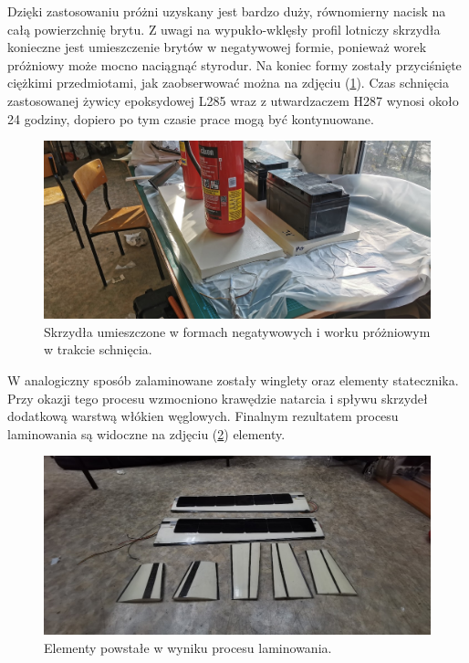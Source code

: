 \documentclass[12pt, a4paper]{article}
\let\oldref\ref
\renewcommand{\ref}[1]{(\oldref{#1})}
\begin{document}
Dzięki zastosowaniu próżni uzyskany jest bardzo duży, równomierny nacisk na całą powierzchnię brytu. Z uwagi na wypukło-wklęsły profil lotniczy skrzydła konieczne jest umieszczenie brytów w negatywowej formie, ponieważ worek próżniowy może mocno naciągnąć styrodur. Na koniec formy zostały przyciśnięte ciężkimi przedmiotami, jak zaobserwować można na zdjęciu \ref{fig:schniecie}. Czas schnięcia zastosowanej żywicy epoksydowej L285 wraz z utwardzaczem H287 wynosi około 24 godziny, dopiero po tym czasie prace mogą być kontynuowane.

 \begin{figure}[ht]
    \centering
    \includegraphics[width=1\textwidth]{budowa9}
    \caption{Skrzydła umieszczone w formach negatywowych i worku próżniowym w trakcie schnięcia.}
    \label{fig:schniecie}
\end{figure}

W analogiczny sposób zalaminowane zostały winglety oraz elementy statecznika. Przy okazji tego procesu wzmocniono krawędzie natarcia i spływu skrzydeł dodatkową warstwą włókien węglowych. Finalnym rezultatem procesu laminowania są widoczne na zdjęciu \ref{fig:kompozytki} elementy.

 \begin{figure}[ht]
    \centering
    \includegraphics[width=1\textwidth]{budowa11}
    \caption{Elementy powstałe w wyniku procesu laminowania.}
    \label{fig:kompozytki}
\end{figure}
\end{document}
